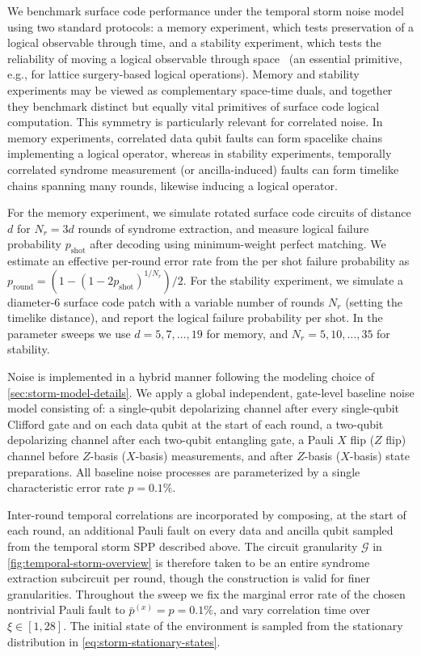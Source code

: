 \documentclass[
    aps,
    prx,
    reprint,
    superscriptaddress,
    longbibliography,
    nofootinbib,
    floatfix,
]{revtex4-2}
\begin{document}
We benchmark surface code performance under the temporal storm noise model using two standard protocols: a memory experiment, which tests preservation of a logical observable through time, and a stability experiment, which tests the reliability of moving a logical observable through space~\cite{gidneyStabilityExperimentsOverlooked2022} (an essential primitive, e.g., for lattice surgery-based logical operations). Memory and stability experiments may be viewed as complementary space-time duals, and together they benchmark distinct but equally vital primitives of surface code logical computation. This symmetry is particularly relevant for correlated noise. In memory experiments, correlated data qubit faults can form spacelike chains implementing a logical operator, whereas in stability experiments, temporally correlated syndrome measurement (or ancilla-induced) faults can form timelike chains spanning many rounds, likewise inducing a logical operator.

For the memory experiment, we simulate rotated surface code circuits of distance \(d\) for \(N_r = 3d\) rounds of syndrome extraction, and measure logical failure probability \(p_\mathrm{shot}\) after decoding using minimum-weight perfect matching. We estimate an effective per-round error rate from the per shot failure probability as \(p_\mathrm{round} = (1 - (1 - 2p_\mathrm{shot})^{1/N_r})/2\). For the stability experiment, we simulate a diameter-6 surface code patch with a variable number of rounds \(N_r\) (setting the timelike distance), and report the logical failure probability per shot. In the parameter sweeps we use \(d = 5, 7, \dots, 19\) for memory, and \(N_r = 5, 10, \dots, 35\) for stability.

Noise is implemented in a hybrid manner following the modeling choice of \cref{sec:storm-model-details}. We apply a global independent, gate-level baseline noise model consisting of: a single-qubit depolarizing channel after every single-qubit Clifford gate and on each data qubit at the start of each round, a two-qubit depolarizing channel after each two-qubit entangling gate, a Pauli \(X\) flip (\(Z\) flip) channel before \(Z\)-basis (\(X\)-basis) measurements, and after \(Z\)-basis (\(X\)-basis) state preparations. All baseline noise processes are parameterized by a single characteristic error rate \(p = 0.1\%\).

Inter-round temporal correlations are incorporated by composing, at the start of each round, an additional Pauli fault on every data and ancilla qubit sampled from the temporal storm SPP described above. The circuit granularity \(\mathcal{G}\) in \cref{fig:temporal-storm-overview} is therefore taken to be an entire syndrome extraction subcircuit per round, though the construction is valid for finer granularities. Throughout the sweep we fix the marginal error rate of the chosen nontrivial Pauli fault to \(\bar{p}^{(x)} = p = 0.1\%\), and vary correlation time over \(\xi \in [1, 28]\). The initial state of the environment is sampled from the stationary distribution in \cref{eq:storm-stationary-states}.
\end{document}
